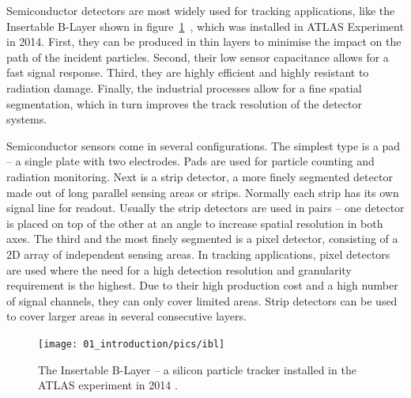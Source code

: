 Semiconductor detectors are most widely used for tracking applications, like the Insertable B-Layer shown in figure~\ref{fig:ibl}~\cite{Pernegger:1985432}, which was installed in ATLAS Experiment in 2014. First, they can be produced in thin layers to minimise the impact on the path of the incident particles. Second, their low sensor capacitance allows for a fast signal response. Third, they are highly efficient and highly resistant to radiation damage. Finally, the industrial processes allow for a fine spatial segmentation, which in turn improves the track resolution of the detector systems. 

Semiconductor sensors come in several configurations. The simplest type is a pad -- a single plate with two electrodes. Pads are used for particle counting and radiation monitoring. Next is a strip detector, a more finely segmented detector made out of long parallel sensing areas or strips. Normally each strip has its own signal line for readout. Usually the strip detectors are used in pairs -- one detector is placed on top of the other at an angle to increase spatial resolution in both axes. The third and the most finely segmented is a pixel detector, consisting of a 2D array of independent sensing areas. In tracking applications, pixel detectors are used where the need for a high detection resolution and granularity requirement is the highest. Due to their high production cost and a high number of signal channels, they can only cover limited areas. Strip detectors can be used to cover larger areas in several consecutive layers.

\begin{figure}[!t]
\centering
\texttt{[image: 01\_introduction/pics/ibl]}
\caption{The Insertable B-Layer -- a silicon particle tracker installed in the ATLAS experiment in 2014 \cite{MarcelloniDeOliveira:1702006}.}
\label{fig:ibl}
\end{figure}




